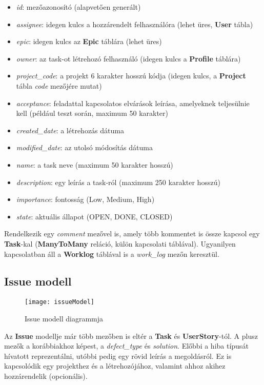 \begin{itemize}
	\item \textit{id}: mezőazonosító (alapvetően generált)
	\item \textit{assignee}: idegen kulcs a hozzárendelt felhasználóra (lehet üres, \textbf{User} tábla)
	\item \textit{epic}: idegen kulcs az \textbf{Epic} táblára (lehet üres)
	\item \textit{owner}: az task-ot létrehozó felhasználó (idegen kulcs a \textbf{Profile} táblára)
	\item \textit{project\_code}: a projekt 6 karakter hosszú kódja (idegen kulcs, a \textbf{Project} tábla \textit{code} mezőjére mutat)
	\item \textit{acceptance}: feladattal kapcsolatos elvárások leírása, amelyeknek teljesülnie kell (például teszt során, maximum 50 karakter)
	\item \textit{created\_date}: a létrehozás dátuma
	\item \textit{modified\_date}: az utolsó módosítás dátuma
	\item \textit{name}: a task neve (maximum 50 karakter hosszú)
	\item \textit{description}: egy leírás a task-ról (maximum 250 karakter hosszú)
	\item \textit{importance}: fontosság (Low, Medium, High)
	\item \textit{state}: aktuális állapot (OPEN, DONE, CLOSED)
\end{itemize}

Rendelkezik egy \textit{comment} mezővel is, amely több kommentet is össze kapcsol egy \textbf{Task}-kal (\textbf{ManyToMany} reláció, külön kapcsolati táblával). Ugyanilyen kapcsolatban áll a \textbf{Worklog} táblával is a \textit{work\_log} mezőn keresztül.

\subsection{Issue modell}

\begin{figure}[H]
	\centering
	\texttt{[image: issueModel]}
	\caption{Issue modell diagrammja}
	\label{fig:issuemodel}
\end{figure}

Az \textbf{Issue} modellje már több mezőben is eltér a \textbf{Task} és \textbf{UserStory}-tól. A plusz mezők a korábbiakhoz képest, a \textit{defect\_type} és \textit{solution}. Előbbi a hiba típusát hívatott reprezentálni, utóbbi pedig egy rövid leírás a megoldásról. Ez is kapcsolódik egy projekthez és a létrehozójához, valamint ahhoz akihez hozzárendelik (opcionális).

